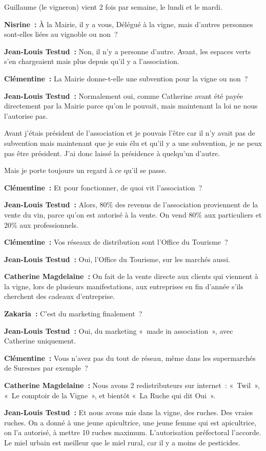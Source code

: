 \documentclass[a4paper, titlepage]{report}
\begin{document}
Guillaume (le vigneron) vient 2 fois par semaine, le lundi et le
mardi.

\textbf{Nisrine~:} À la Mairie, il y a vous, Délégué à la vigne, mais
d'autres personnes sont-elles liées au vignoble ou non~?

\textbf{Jean-Louis Testud~:} Non, il n'y a personne d'autre. Avant, les
espaces verts s'en chargeaient mais plus depuis qu'il y a l'association.

\textbf{Clémentine~:} La Mairie donne-t-elle une subvention pour la
vigne ou non~?

\textbf{Jean-Louis Testud~:} Normalement oui, comme Catherine avant été
payée directement par la Mairie parce qu'on le pouvait, mais maintenant
la loi ne nous l'autorise pas.

Avant j'étais président de l'association et je pouvais l'être car il n'y
avait pas de subvention mais maintenant que je suis élu et qu'il y a une
subvention, je ne peux pas être président. J'ai donc laissé la
présidence à quelqu'un d'autre.

Mais je porte toujours un regard à ce qu'il se passe.

\textbf{Clémentine~:} Et pour fonctionner, de quoi vit l'association~?

\textbf{Jean-Louis Testud~:} Alors, 80\% des revenus de l'association
proviennent de la vente du vin, parce qu'on est autorisé à la vente. On
vend 80\% aux particuliers et 20\% aux professionnels.

\textbf{Clémentine~:} Vos réseaux de distribution sont l'Office du
Tourisme~?

\textbf{Jean-Louis Testud~:} Oui, l'Office du Tourisme, sur les marchés
aussi.

\textbf{Catherine Magdelaine~:} On fait de la vente directe aux clients qui viennent à la
vigne, lors de plusieurs manifestations, aux entreprises en fin d'année
s'ils cherchent des cadeaux d'entreprise.

\textbf{Zakaria~:} C'est du marketing finalement~?

\textbf{Jean-Louis Testud~:} Oui, du marketing «~made in association~»,
avec Catherine uniquement.

\textbf{Clémentine~:} Vous n'avez pas du tout de réseau, même dans les
supermarchés de Suresnes par exemple~?

\textbf{Catherine Magdelaine~:} Nous avons 2 redistributeurs sur
internet~: «~Twil~», «~Le comptoir de la Vigne~», et bientôt «~La Ruche
qui dit Oui~».

\textbf{Jean-Louis Testud~:} Et nous avons mis dans la vigne, des
ruches. Des vraies ruches. On a donné à une jeune apicultrice, une jeune
femme qui est apicultrice, on l'a autorisé, à mettre 10 ruches maximum.
L'autorisation préfectoral l'accorde. Le miel urbain est meilleur que le
miel rural, car il y a moins de pesticides.
\end{document}
